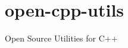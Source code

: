 \chapter{open-\/cpp-\/utils}
\hypertarget{md__r_e_a_d_m_e}{}\label{md__r_e_a_d_m_e}
\label{md__r_e_a_d_m_e_autotoc_md0}%
%
Open Source Utilities for C++ 